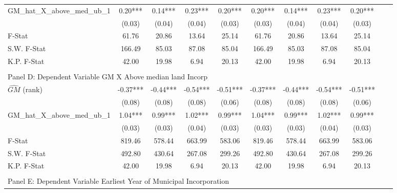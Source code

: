 \begin{table}[htbp]
\begin{threeparttable}
\begin{tabular}{l*{10}{c}}
\addlinespace
GM\_hat\_X\_above\_med\_ub\_1&       0.20***&       0.14***&       0.23***&       0.20***&       0.20***&       0.14***&       0.23***&       0.20***\\
                &     (0.03)   &     (0.04)   &     (0.04)   &     (0.03)   &     (0.03)   &     (0.04)   &     (0.04)   &     (0.03)   \\
\midrule
F-Stat          &      61.76   &      20.86   &      13.64   &      25.14   &      61.76   &      20.86   &      13.64   &      25.14   \\
S.W. F-Stat     &     166.49   &      85.03   &      87.08   &      85.04   &     166.49   &      85.03   &      87.08   &      85.04   \\
K.P. F-Stat     &      42.00   &      19.98   &       6.94   &      20.13   &      42.00   &      19.98   &       6.94   &      20.13   \\
\cmidrule[\heavyrulewidth](lr){1-9} \\ \cmidrule[\heavyrulewidth](lr){1-9}
\multicolumn{8}{l}{Panel D: Dependent Variable GM X Above median land Incorp}\\
\cmidrule(lr){1-9}
$\hat{GM}$ (rank)&      -0.37***&      -0.44***&      -0.54***&      -0.51***&      -0.37***&      -0.44***&      -0.54***&      -0.51***\\
                &     (0.08)   &     (0.08)   &     (0.08)   &     (0.06)   &     (0.08)   &     (0.08)   &     (0.08)   &     (0.06)   \\
\addlinespace
GM\_hat\_X\_above\_med\_ub\_1&       1.04***&       0.99***&       1.02***&       0.99***&       1.04***&       0.99***&       1.02***&       0.99***\\
                &     (0.03)   &     (0.03)   &     (0.04)   &     (0.03)   &     (0.03)   &     (0.03)   &     (0.04)   &     (0.03)   \\
\midrule
F-Stat          &     819.46   &     578.44   &     663.99   &     583.06   &     819.46   &     578.44   &     663.99   &     583.06   \\
S.W. F-Stat     &     492.80   &     430.64   &     267.08   &     299.26   &     492.80   &     430.64   &     267.08   &     299.26   \\
K.P. F-Stat     &      42.00   &      19.98   &       6.94   &      20.13   &      42.00   &      19.98   &       6.94   &      20.13   \\
\cmidrule[\heavyrulewidth](lr){1-9} \\ \cmidrule[\heavyrulewidth](lr){1-9}
\multicolumn{8}{l}{Panel E: Dependent Variable Earliest Year of Municipal Incorporation}\\

\end{tabular}
\end{threeparttable}
\end{table}
